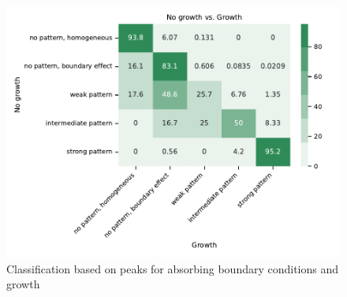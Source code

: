\begin{figure}[H] %
    \centering
    \begin{adjustbox}{center}
        \includegraphics[width=1\textwidth]{chapters/Chapter 1/openboundary_edgegrowth2_confusion_variant0-11-12} %
    \end{adjustbox}
    \caption{Classification based on peaks for absorbing boundary conditions and growth}
    \label{fig:openboundary_edgegrowth2_confusion_variant0} %
\end{figure}

